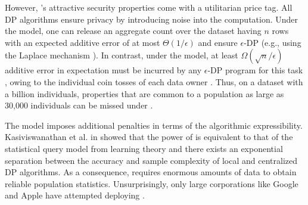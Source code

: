 However, \ldp's attractive security properties come with a utilitarian price tag. All DP algorithms ensure privacy by introducing noise into the computation. Under the \cdp model, one can release an aggregate count over the dataset having $n$ rows with an expected additive error of at most $\Theta(1/\epsilon)$ and ensure $\epsilon$-DP (e.g., using the Laplace mechanism \cite{dwork}). In contrast, under the \ldp model, at least $\Omega(\sqrt{n}/\epsilon)$ additive error in expectation must be incurred by any $\epsilon$-DP program for this task \cite{error1,error2,error3}, owing to the individual coin tosses of each data owner \cite{Prochlo,Rappor1,Rappor2,LDP1}. %
Thus, on a dataset with a billion individuals, properties that are common to a population as large as 30,000 individuals can be missed under \ldp. 

The \ldp model imposes additional penalties in terms of the  algorithmic expressibility.  Kasiviswanathan et al. in \cite{Kasivi} showed that the power of \ldp is equivalent to that of the statistical query model \cite{SQ1} from learning theory and there exists an exponential separation between the accuracy and sample complexity of local and centralized DP algorithms.  As a consequence, \ldp requires enormous amounts of data to obtain reliable population statistics. Unsurprisingly, only large corporations  like Google \cite{Rappor1,Rappor2,Prochlo} and Apple \cite{Apple} have attempted deploying \ldp.
 
